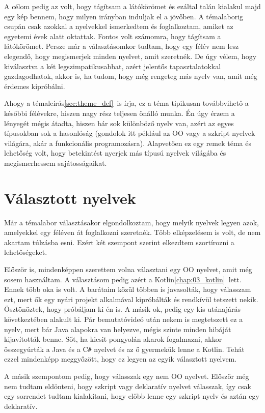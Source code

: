 A célom pedig az volt, hogy tágítsam a látókörömet és ezáltal talán kialakul majd egy kép bennem, hogy milyen irányban induljak el a jövőben. A témalaborig csupán csak azokkal a nyelvekkel ismerkedtem és foglalkoztam, amiket az egyetemi évek alatt oktattak. Fontos volt számomra, hogy tágítsam a látókörömet. Persze már a választásomkor tudtam, hogy egy félév nem lesz elegendő, hogy megismerjek minden nyelvet, amit szeretnék. De úgy vélem, hogy kiválasztva a két legszimpatikusabbat, azért jelentős tapasztalatokkal gazdagodhatok, akkor is, ha tudom, hogy még rengeteg más nyelv van, amit még érdemes kipróbálni.

Ahogy a témaleírás\ref{sec:theme_def}~is írja, ez a téma tipikusan továbbvihető a későbbi félévekre, hiszen nagy rész teljesen önálló munka. Én úgy érzem a lényegét mégis átadta, hiszen bár sok különböző nyelv van, azért az egyes típusokban sok a hasonlóság (gondolok itt például az OO vagy a szkript nyelvek világára, akár a funkcionális programozásra). Alapvetően ez egy remek téma és lehetőség volt, hogy betekintést nyerjek más típusú nyelvek világába és megismerhessem sajátosságaikat. 
  
\section{Választott nyelvek}
\label{sec:choosed_lang}

Már a témalabor választásakor elgondolkoztam, hogy melyik nyelvek legyen azok, amelyekkel egy féléven át foglalkozni szeretnék. Több elképzelésem is volt, de nem akartam túlzásba esni. Ezért két szempont szerint elkezdtem szortírozni a lehetőségeket. 

Először is, mindenképpen szerettem volna választani egy OO nyelvet, amit még sosem használtam. A választásom pedig azért a Kotlin\ref{chap:03_kotlin}~lett. Ennek több oka is volt. A barátaim közül többen is javasolták, hogy válasszam ezt, mert ők egy nyári projekt alkalmával kipróbálták és rendkívül tetszett nekik. Ösztönöztek, hogy próbáljam ki én is. A másik ok, pedig egy kis utánajárás következtében alakult ki. Pár bemutatóvideó után nekem is megtetszett ez a nyelv, mert bár Java alapokra van helyezve, mégis szinte minden hibáját kijavították benne. Sőt, ha kicsit pongyolán akarok fogalmazni, akkor összegyúrták a Java és a C\verb|#| nyelvet és az ő gyermekük lenne a Kotlin. Tehát ezzel mindenképp meggyőzött, hogy ez legyen az egyik választott nyelvem.

A másik szempontom pedig, hogy válasszak egy nem OO nyelvet. Először még nem tudtam eldönteni, hogy szkript vagy deklaratív nyelvet válasszak, így csak egy sorrendet tudtam kialakítani, hogy előbb lenne egy szkript nyelv és aztán egy deklaratív. 

